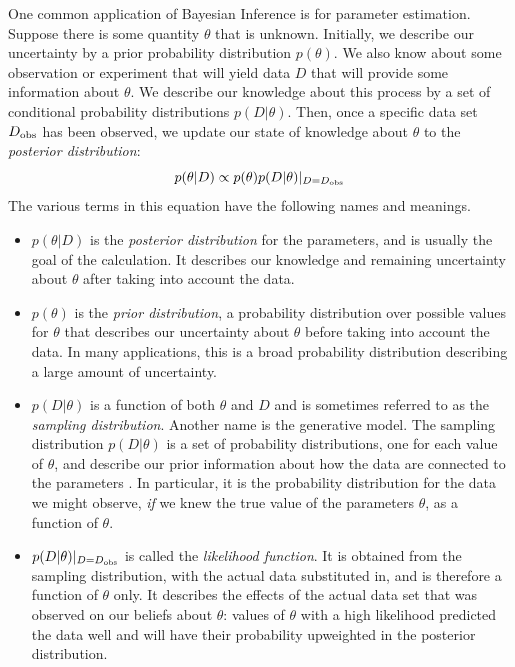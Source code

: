 \documentclass[letterpaper, 11pt]{article}
\begin{document}
One common application of Bayesian Inference is for parameter estimation.
Suppose there is some quantity $\theta$ that is unknown. Initially, we describe
our uncertainty by a prior probability distribution $p(\theta)$. We also know about some
observation or experiment that will yield data $D$ that will provide some
information about $\theta$. We describe our knowledge about this process by a 
set of conditional probability distributions $p(D|\theta)$. Then, once a specific data set
$D_{\rm obs}$ has been observed, we update our state of knowledge about $\theta$
to the {\it posterior distribution}:
\begin{equation}
p(\theta | D) \propto p(\theta) p(D|\theta)|_{D=D_{\rm obs}}
\end{equation}
The various terms in this equation have the following names and meanings.

\begin{itemize}
\item $p(\theta|D)$ is the {\it posterior distribution}
for the parameters, and is usually the goal of the calculation. It describes our
knowledge and remaining uncertainty about $\theta$ after taking into account the data. \\

\item $p(\theta)$ is the {\it prior distribution}, a probability distribution
over possible values for $\theta$ that describes our uncertainty about
$\theta$ before taking into account the data. In many applications, this is a broad
probability distribution describing a large amount of uncertainty. \\

\item $p(D|\theta)$ is a function of
both $\theta$ and $D$ and is sometimes referred to as the {\it sampling distribution}.
Another name is the generative model. 
The sampling distribution $p(D|\theta)$ is a set of probability distributions,
one for each value of $\theta$, and describe our prior information about how the data are connected to the parameters \citep{2008arXiv0808.0012C}. In particular, it is the probability distribution
for the data we might observe, {\it if} we knew the true value of the parameters
$\theta$, as a function of $\theta$.

\item $p(D|\theta)|_{D = D_{\rm obs}}$ is called the {\it likelihood function}.
It is obtained from the sampling distribution, with the actual data substituted in,
and is therefore a function of $\theta$ only. It describes the effects of the actual data
set that was observed on our beliefs about $\theta$: values of $\theta$ with a high
likelihood predicted the data well and will have their probability upweighted
in the posterior distribution.
\end{itemize}
\end{document}
